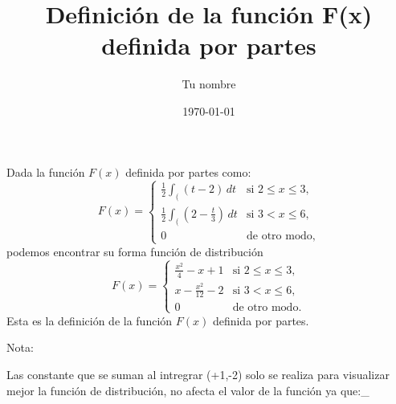 \documentclass{article}
\title{Definición de la función F(x) definida por partes}
\author{Tu nombre}
\date{\today}
\begin{document}
\maketitle
 \noindent
Dada la función $F(x)$ definida por partes como:
 \[
F(x)=
\begin{cases}
    \displaystyle{\frac{1}{2}\int_((t-2)\, dt} & \text{si } 2\leq x\leq 3, \\
    \displaystyle{\frac{1}{2}\int_((2-\frac{t}{3})\, dt} & \text{si } 3< x\leq 6, \\
    0 & \text{de otro modo},
\end{cases}
\]
 podemos encontrar su forma función de distribución
 \[
F(x)=
\begin{cases}
    \displaystyle{\frac{x^{2}}{4}-x+1} & \text{si } 2\leq x\leq 3, \\
    \displaystyle{x-\frac{x^{2}}{12}-2} & \text{si } 3< x\leq 6, \\
    0 & \text{de otro modo}.
\end{cases}
\]
 Esta es la definición de la función $F(x)$ definida por partes.
 
\begin{center}
    Nota:
\end{center}
Las constante que se suman al intregrar (+1,-2) solo se realiza para visualizar
mejor la función de distribución, no afecta el valor de la función ya que:\int_
 
\end{document}

